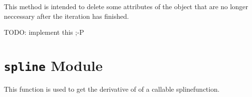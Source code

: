 \documentclass[letterpaper,10pt,english]{sphinxmanual}
\begin{document}
\begin{fulllineitems}
\begin{fulllineitems}
\end{fulllineitems}


\begin{fulllineitems}
\label{pytrajectory:pytrajectory.trajectory.Trajectory.clear}
This method is intended to delete some attributes of the object that
are no longer neccessary after the iteration has finished.

TODO: implement this ;-P

\end{fulllineitems}


\end{fulllineitems}



\section{\texttt{spline} Module}
\label{pytrajectory:spline-module}\label{pytrajectory:module-pytrajectory.spline}

\begin{fulllineitems}
\label{pytrajectory:pytrajectory.spline.fdiff}
This function is used to get the derivative of of a callable splinefunction.
\begin{quote}\begin{description}
\end{description}\end{quote}

\end{fulllineitems}

\end{document}
